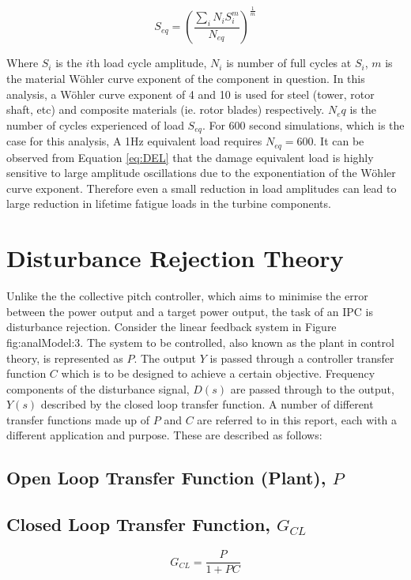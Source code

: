 \begin{equation}\label{eq:DEL}
S_{eq} = \left(\frac{\sum_i N_iS_i^m}{N_{eq}}\right)^{\frac{1}{m}}
\end{equation}

Where $S_i$ is the $i$th load cycle amplitude, $N_i$ is number of full cycles at $S_i$, $m$ is the material W\"{o}hler curve exponent of the component in question. In this analysis, a W\"{o}hler curve exponent of 4 and 10 is used for steel (tower, rotor shaft, etc) and composite materials (ie. rotor blades) respectively. $N_eq$ is the number of cycles experienced of load $S_{eq}$. For 600 second simulations, which is the case for this analysis, A 1Hz equivalent load requires $N_{eq}=600$. It can be observed from Equation \ref{eq:DEL} that the damage equivalent load is highly sensitive to large amplitude oscillations due to the exponentiation of the W\"{o}hler curve exponent. Therefore even a small reduction in load amplitudes can lead to large reduction in lifetime fatigue loads in the turbine components.



\section{Disturbance Rejection Theory}

Unlike the the collective pitch controller, which aims to minimise the error between the power output and a target power output, the task of an IPC is disturbance rejection. Consider the linear feedback system in Figure fig:analModel:3. The system to be controlled, also known as the plant in control theory, is represented as $P$. The output $Y$ is passed through a controller transfer function $C$ which is to be designed to achieve a certain objective. Frequency components of the disturbance signal, $D(s)$ are passed through to the output, $Y(s)$ described by the closed loop transfer function.  A number of different transfer functions made up of $P$ and $C$ are referred to in this report, each with a different application and purpose. These are described as follows:
\subsection*{Open Loop Transfer Function (Plant), $P$}

\subsection*{Closed Loop Transfer Function, $G_{CL}$}
\begin{equation}
   G_{CL} = \frac{P}{1+PC}
\end{equation}

